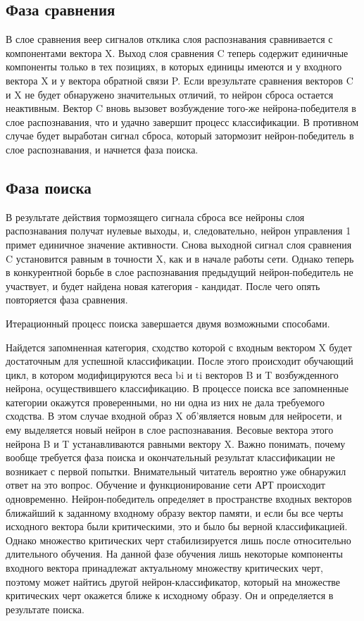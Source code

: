 \documentclass[12pt,a4paper,article]{article}
\begin{document}
\subsection{Фаза сравнения}
В слое сравнения веер сигналов отклика слоя распознавания сравнивается с компонентами вектора X. Выход слоя сравнения C теперь содержит единичные компоненты только в тех позициях, в которых единицы имеются и у входного вектора X и у вектора обратной связи P. Если врезультате сравнения векторов C и X не будет обнаружено значительных отличий, то нейрон сброса остается неактивным. Вектор C вновь вызовет возбуждение того-же нейрона-победителя в слое распознавания, что и удачно завершит процесс классификации. В противном случае будет выработан сигнал сброса, который затормозит нейрон-победитель в слое распознавания, и начнется фаза поиска.

\subsection{Фаза поиска}
В результате действия тормозящего сигнала сброса все нейроны слоя распознавания получат нулевые выходы, и, следовательно, нейрон управления 1 примет единичное значение активности. Снова выходной сигнал слоя сравнения C установится равным в точности X, как и в начале работы сети. Однако теперь в конкурентной борьбе в слое распознавания предыдущий нейрон-победитель не участвует, и будет найдена новая категория - кандидат. После чего опять повторяется фаза сравнения.

Итерационный процесс поиска завершается двумя возможными способами.

Найдется запомненная категория, сходство которой с входным вектором X будет достаточным для успешной классификации. После этого происходит обучающий цикл, в котором модифицируются веса bi и ti векторов B и T возбужденного нейрона, осуществившего классификацию.
В процессе поиска все запомненные категории окажутся проверенными, но ни одна из них не дала требуемого сходства. В этом случае входной образ X об'является новым для нейросети, и ему выделяется новый нейрон в слое распознавания. Весовые вектора этого нейрона B и T устанавливаются равными вектору X.
Важно понимать, почему вообще требуется фаза поиска и окончательный результат классификации не возникает с первой попытки. Внимательный читатель вероятно уже обнаружил ответ на это вопрос. Обучение и функционирование сети АРТ происходит одновременно. Нейрон-победитель определяет в пространстве входных векторов ближайший к заданному входному образу вектор памяти, и если бы все черты исходного вектора были критическими, это и было бы верной классификацией. Однако множество критических черт стабилизируется лишь после относительно длительного обучения. На данной фазе обучения лишь некоторые компоненты входного вектора принадлежат актуальному множеству критических черт, поэтому может найтись другой нейрон-классификатор, который на множестве критических черт окажется ближе к исходному образу. Он и определяется в результате поиска.
\end{document}

